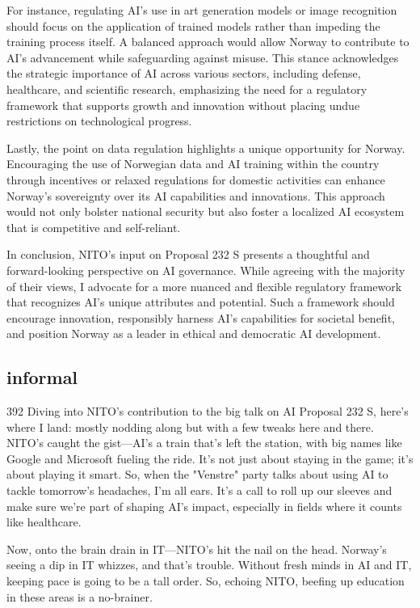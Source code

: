 \documentclass[12pt]{article}
\begin{document}
For instance, regulating AI's use in art generation models or image recognition should focus on the application of trained models rather than impeding the training process itself. A balanced approach would allow Norway to contribute to AI's advancement while safeguarding against misuse. This stance acknowledges the strategic importance of AI across various sectors, including defense, healthcare, and scientific research, emphasizing the need for a regulatory framework that supports growth and innovation without placing undue restrictions on technological progress.

Lastly, the point on data regulation highlights a unique opportunity for Norway. Encouraging the use of Norwegian data and AI training within the country through incentives or relaxed regulations for domestic activities can enhance Norway's sovereignty over its AI capabilities and innovations. This approach would not only bolster national security but also foster a localized AI ecosystem that is competitive and self-reliant.

In conclusion, NITO's input on Proposal 232 S presents a thoughtful and forward-looking perspective on AI governance. While agreeing with the majority of their views, I advocate for a more nuanced and flexible regulatory framework that recognizes AI's unique attributes and potential. Such a framework should encourage innovation, responsibly harness AI's capabilities for societal benefit, and position Norway as a leader in ethical and democratic AI development.


\subsection{informal}392
Diving into NITO's contribution to the big talk on AI Proposal 232 S, here's where I land: mostly nodding along but with a few tweaks here and there. NITO's caught the gist—AI's a train that's left the station, with big names like Google and Microsoft fueling the ride. It's not just about staying in the game; it's about playing it smart. So, when the "Venstre" party talks about using AI to tackle tomorrow's headaches, I'm all ears. It's a call to roll up our sleeves and make sure we're part of shaping AI's impact, especially in fields where it counts like healthcare.

Now, onto the brain drain in IT—NITO's hit the nail on the head. Norway's seeing a dip in IT whizzes, and that's trouble. Without fresh minds in AI and IT, keeping pace is going to be a tall order. So, echoing NITO, beefing up education in these areas is a no-brainer.
\end{document}
